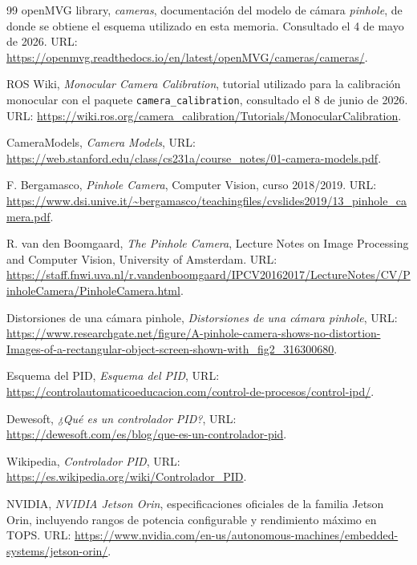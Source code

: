 \begin{thebibliography}{99}
 openMVG library, \textit{cameras}, documentación del modelo de cámara \textit{pinhole}, de donde se obtiene el esquema utilizado en esta memoria. Consultado el 4 de mayo de 2026. URL: \url{https://openmvg.readthedocs.io/en/latest/openMVG/cameras/cameras/}.

 ROS Wiki, \textit{Monocular Camera Calibration}, tutorial utilizado para la calibración monocular con el paquete \texttt{camera\_calibration}, consultado el 8 de junio de 2026. URL: \url{https://wiki.ros.org/camera_calibration/Tutorials/MonocularCalibration}.

 CameraModels, \textit{Camera Models}, URL: \url{https://web.stanford.edu/class/cs231a/course_notes/01-camera-models.pdf}.

 F. Bergamasco, \textit{Pinhole Camera}, Computer Vision, curso 2018/2019. URL: \url{https://www.dsi.unive.it/~bergamasco/teachingfiles/cvslides2019/13_pinhole_camera.pdf}.

 R. van den Boomgaard, \textit{The Pinhole Camera}, Lecture Notes on Image Processing and Computer Vision, University of Amsterdam. URL: \url{https://staff.fnwi.uva.nl/r.vandenboomgaard/IPCV20162017/LectureNotes/CV/PinholeCamera/PinholeCamera.html}.

 Distorsiones de una cámara pinhole, \textit{Distorsiones de una cámara pinhole}, URL: \url{https://www.researchgate.net/figure/A-pinhole-camera-shows-no-distortion-Images-of-a-rectangular-object-screen-shown-with_fig2_316300680}.


 Esquema del PID, \textit{Esquema del PID}, URL: \url{https://controlautomaticoeducacion.com/control-de-procesos/control-ipd/}.

 Dewesoft, \textit{¿Qué es un controlador PID?}, URL: \url{https://dewesoft.com/es/blog/que-es-un-controlador-pid}.

 Wikipedia, \textit{Controlador PID}, URL: \url{https://es.wikipedia.org/wiki/Controlador_PID}.

 NVIDIA, \textit{NVIDIA Jetson Orin}, especificaciones oficiales de la familia Jetson Orin, incluyendo rangos de potencia configurable y rendimiento máximo en TOPS. URL: \url{https://www.nvidia.com/en-us/autonomous-machines/embedded-systems/jetson-orin/}.


\end{thebibliography}
